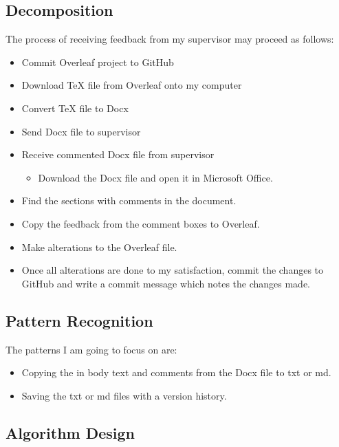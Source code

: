 \documentclass{article}
\begin{document}
\subsection{Decomposition}

The process of receiving feedback from my supervisor may proceed as follows:

\begin{itemize}
    \item Commit Overleaf project to GitHub
    \item Download TeX file from Overleaf onto my computer
    \item Convert TeX file to Docx
    \item Send Docx file to supervisor
    \item Receive commented Docx file from supervisor
    \begin{itemize}
    \item Download the Docx file and open it in Microsoft Office.
    \end{itemize}
    \item Find the sections with comments in the document.
    \item Copy the feedback from the comment boxes to Overleaf.
    \item Make alterations to the Overleaf file.
    \item Once all alterations are done to my satisfaction, commit the changes to GitHub and write a commit message which notes the changes made.
    
\end{itemize}

\subsection{Pattern Recognition}

The patterns I am going to focus on are:

\begin{itemize}
    \item Copying the in body text and comments from the Docx file to txt or md.
    \item Saving the txt or md files with a version history.

\end{itemize}

\subsection{Algorithm Design}
\end{document}
